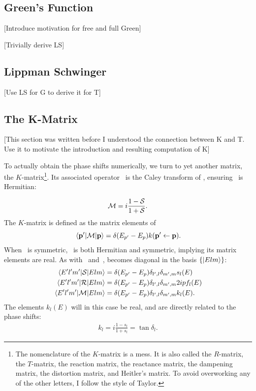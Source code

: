 \subsection{Green's Function}
[Introduce motivation for free and full Green]

[Trivially derive LS]

\subsection{Lippman Schwinger}
[Use LS for G to derive it for T]

\subsection{The K-Matrix}
[This section was written before I understood the connection between K and T.
Use it to motivate the introduction and resulting computation of K]

To actually obtain the phase shifts numerically, we turn to yet another matrix,
the \(K\)-matrix\footnote{The nomenclature of the \(K\)-matrix is a mess. It is
  also called the \(R\)-matrix, the \(T\)-matrix, the reaction matrix, the
  reactance matrix, the dampening matrix, the distortion matrix, and Heitler's
  matrix. To avoid overworking any of the other
  letters, I follow the style of Taylor.}. Its associated operator\  is the Caley transform of
, ensuring\  is Hermitian:

\begin{equation*}
  \mathcal{M} = i \frac{1-\mathcal{S}}{1+\mathcal{S}}.
\end{equation*}
The \(K\)-matrix is defined as the matrix elements of\ 
\begin{equation*}
  \mel{\vb{p}^{\prime}}{\mathcal{M}}{\vb{p}} = \delta(E_{p^{\prime}}-E_{p})k(\vb{p}^{\prime}\leftarrow\vb{p}).
\end{equation*}
When\  is symmetric,\  is both Hermitian and
symmetric, implying its matrix elements are real.
As with\  and\ ,  becomes diagonal in the basis
\(\left\{ \ket{Elm} \right\}\):
\begin{align*}
  \mel{E^{\prime}l^{\prime}m^{\prime}}{\mathcal{S}}{Elm} &= \delta(E_{p^{\prime}}-E_{p})\delta_{l^{\prime},l}\delta_{m^{\prime},m}s_{l}(E)\\
  \mel{E^{\prime}l^{\prime}m^{\prime}}{\mathcal{R}}{Elm} &= \delta(E_{p^{\prime}}-E_{p})\delta_{l^{\prime},l}\delta_{m^{\prime},m}2ipf_{l}(E)\\
  \mel{E^{\prime}l^{\prime}m^{\prime}}{\mathcal{M}}{Elm} &= \delta(E_{p^{\prime}}-E_{p})\delta_{l^{\prime},l}\delta_{m^{\prime},m}k_{l}(E).\\
\end{align*}
The elements \(k_{l}(E)\) will in this case be real, and are directly related to
the phase shifts:
\begin{align*}
  k_{l} = i \frac{1-s_{l}}{1+s_{l}} = \tan\delta_{l}.
\end{align*}

